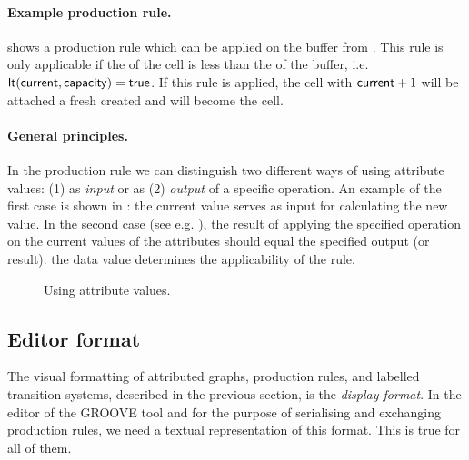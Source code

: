 \paragraph{Example production rule.}

 shows a production rule which can
be applied on the buffer from . This rule
is only applicable if the \bufferIndex{} of the \current{} cell is less than
the \capacity{} of the buffer, i.e. $\mathsf{lt}(\mathsf{current},\mathsf{capacity}) =
\mathsf{true}$. If this rule is applied, the cell with \bufferIndex{}
$\mathsf{current} + 1$ will be attached a fresh created \Object{} and will
become the \current{} cell.


\paragraph{General principles.} In the production rule we can
distinguish two different ways of using attribute values: (1) as
\emph{input} or as (2) \emph{output} of a specific operation. An
example of the first case is shown in : the current value
serves as input for calculating the new value. In the second case
(see e.g. ), the result of applying the specified
operation on the current values of the attributes should equal the
specified output (or result): the data value determines the
applicability of the rule.

\begin{figure}[htbp]
\begin{center}
\caption{Using attribute values.}
\end{center}
\end{figure}

\subsection{Editor format}

The visual formatting of attributed graphs, production rules, and
labelled transition systems, described in the previous section, is the
\emph{display format}. In the editor of the GROOVE tool and for the
purpose of serialising and exchanging production rules, we need a
textual representation of this format. This is true for all of them.

